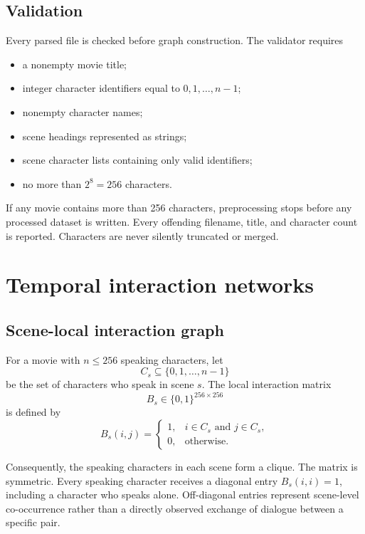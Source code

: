\documentclass[11pt]{article}
\begin{document}
\subsection{Validation}

Every parsed file is checked before graph construction. The validator requires

\begin{itemize}[leftmargin=2em]
  \item a nonempty movie title;
  \item integer character identifiers equal to $0,1,\ldots,n-1$;
  \item nonempty character names;
  \item scene headings represented as strings;
  \item scene character lists containing only valid identifiers;
  \item no more than $2^8=256$ characters.
\end{itemize}

If any movie contains more than 256 characters, preprocessing stops before any processed dataset is written. Every offending filename, title, and character count is reported. Characters are never silently truncated or merged.

\section{Temporal interaction networks}

\subsection{Scene-local interaction graph}

For a movie with $n\leq256$ speaking characters, let
\[
C_s\subseteq\{0,1,\ldots,n-1\}
\]
be the set of characters who speak in scene $s$. The local interaction matrix
\[
B_s\in\{0,1\}^{256\times256}
\]
is defined by
\begin{equation}
  B_s(i,j)=
  \begin{cases}
    1, & i\in C_s\text{ and }j\in C_s,\\
    0, & \text{otherwise}.
  \end{cases}
  \label{eq:local-adjacency}
\end{equation}

Consequently, the speaking characters in each scene form a clique. The matrix is symmetric. Every speaking character receives a diagonal entry $B_s(i,i)=1$, including a character who speaks alone. Off-diagonal entries represent scene-level co-occurrence rather than a directly observed exchange of dialogue between a specific pair.
\end{document}
